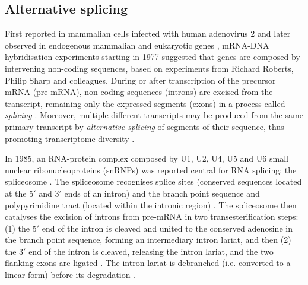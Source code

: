 
\subsection{Alternative splicing}



First reported in mammalian cells infected with human adenovirus 2 \cite{berget:1977wp,chow:1977wn} and later observed in endogenous mammalian and eukaryotic genes \cite{brack:1977we,early:1980wq}, mRNA-DNA hybridisation experiments starting in 1977 suggested that genes are composed by intervening non-coding sequences, based on experiments from Richard Roberts, Philip Sharp and colleagues. During or after transcription of the precursor mRNA (pre-mRNA), non-coding sequences (introns) are excised from the transcript, remaining only the expressed segments (exons) in a process called \emph{splicing} \cite{berget:1977wp,chow:1977wn,gilbert:1978wr}. Moreover, multiple different transcripts may be produced from the same primary transcript by \emph{alternative splicing} of segments of their sequence, thus promoting transcriptome diversity \cite{berget:1977wp,chow:1977wn,chow:1978wk,nevins:1978tt,schmucker:2000wf}.

In 1985, an RNA-protein complex composed by U1, U2, U4, U5 and U6 small nuclear ribonucleoproteins (snRNPs) was reported central for RNA splicing: the spliceosome \cite{grabowski:1985vm}. The spliceosome recognises splice sites (conserved sequences located at the 5$'$ and 3$'$ ends of an intron) and the branch point sequence and polypyrimidine tract (located within the intronic region) \cite{mount:1982tu,black:1985ul}. The spliceosome then catalyses the excision of introns from pre-mRNA in two transesterification steps: (1) the 5$'$ end of the intron is cleaved and united to the conserved adenosine in the branch point sequence, forming an intermediary intron lariat, and then (2) the 3$'$ end of the intron is cleaved, releasing the intron lariat, and the two flanking exons are ligated \cite{grabowski:1985vm,ruskin:1985vl,horowitz:1993wq}. The intron lariat is debranched (i.e. converted to a linear form) before its degradation \cite{ruskin:1985vl,arenas:1987vc}.

